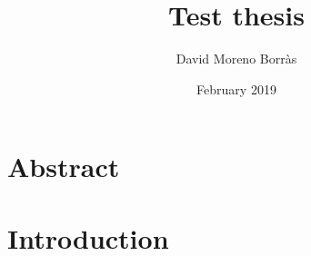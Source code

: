 \documentclass{report}
\title{Test thesis}
\author{David Moreno Borr\`as}
\date{February 2019}
\begin{document}
\maketitle

\chapter{Abstract}

\tableofcontents
\listoffigures

\chapter{Introduction}
\end{document}
